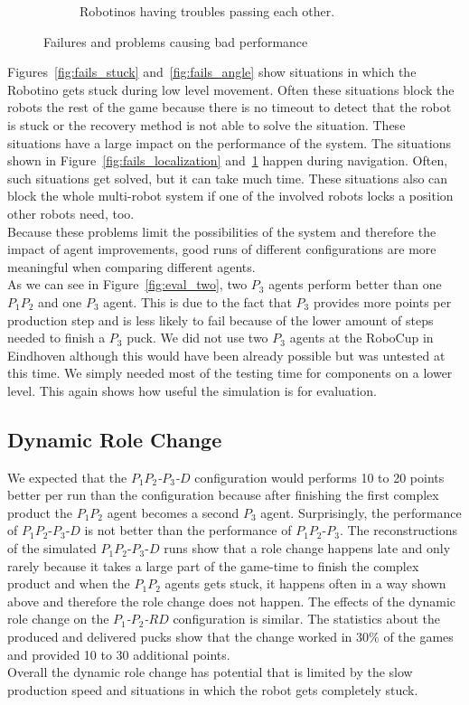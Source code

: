 \begin{figure}
\begin{subfigure}[b]{0.38\textwidth}
    \caption{Robotinos having troubles passing each other.}
    \label{fig:fails_passing}
  \end{subfigure}
  \caption{Failures and problems causing bad performance}
  \label{fig:fails}
\end{figure}
Figures~\ref{fig:fails_stuck} and~\ref{fig:fails_angle} show situations in which the Robotino gets stuck during low level movement. Often these situations block the robots the rest of the game because there is no timeout to detect that the robot is stuck or the recovery method is not able to solve the situation. These situations have a large impact on the performance of the system. The situations shown in Figure~\ref{fig:fails_localization} and~\ref{fig:fails_passing} happen during navigation. Often, such situations get solved, but it can take much time. These situations also can block the whole multi-robot system if one of the involved robots locks a position other robots need, too.\\
Because these problems limit the possibilities of the system and therefore the impact of agent improvements, good runs of different configurations are more meaningful when comparing different agents.\\
As we can see in Figure~\ref{fig:eval_two}, two $P_3$ agents perform better than one $P_1P_2$ and one $P_3$ agent. This is due to the fact that $P_3$ provides more points per production step and is less likely to fail because of the lower amount of steps needed to finish a $P_3$ puck. We did not use two $P_3$ agents at the RoboCup in Eindhoven although this would have been already possible but was untested at this time. We simply needed most of the testing time for components on a lower level. This again shows how useful the simulation is for evaluation.

\subsection{Dynamic Role Change}
We expected that the \textit{$P_1P_2$-$P_3$-$D$} configuration would performs 10 to 20 points better per run than the  configuration because after finishing the first complex product the $P_1P_2$ agent becomes a second $P_3$ agent. Surprisingly, the performance of $P_1P_2$-$P_3$-$D$ is not better than the performance of $P_1P_2$-$P_3$. The reconstructions of the simulated $P_1P_2$-$P_3$-$D$ runs show that a role change happens late and only rarely because it takes a large part of the game-time to finish the complex product and when the $P_1P_2$ agents gets stuck, it happens often in a way shown above and therefore the role change does not happen. The effects of the dynamic role change on the \textit{$P_1$-$P_2$-$RD$} configuration is similar. The statistics about the produced and delivered pucks show that the change worked in $30\%$ of the games and provided 10 to 30 additional points.\\
Overall the dynamic role change has potential that is limited by the slow production speed and situations in which the robot gets completely stuck.

